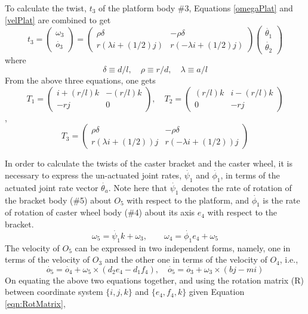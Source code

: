 To calculate the twist, $t_3$ of the platform body \#3, Equations \ref{omegaPlat} and \ref{velPlat} are combined to get
\begin{equation}
\label{twist3}
t_3=\begin{pmatrix}
\omega_3\\\dot{o_3}
\end{pmatrix}=
\begin{pmatrix}
\rho\delta & -\rho\delta\\
r(\lambda i+(1/2)j) & r(-\lambda i+(1/2)j)
\end{pmatrix}
\begin{pmatrix}
\dot{\theta_1}\\\dot{\theta_2}
\end{pmatrix}
\end{equation}
where
\[ \delta\equiv d/l, \quad \rho \equiv r/d, \quad \lambda \equiv a/l \]
From the above three equations, one gets 
\[T_1=\begin{pmatrix}i+(r/l)k & -(r/l)k\\ -rj & 0\end{pmatrix}, \quad  
T_2=\begin{pmatrix}	(r/l)k & i-(r/l)k\\  0 & -rj \end{pmatrix}\],
\[T_3=\begin{pmatrix}
	\rho\delta & -\rho\delta\\
	r(\lambda i+(1/2))j & r(-\lambda i+(1/2))j
	\end{pmatrix}\]


In order to calculate the twists of the caster bracket and the caster wheel, it is necessary to express the  un-actuated joint rates, $\dot{\psi_1}$ and $\dot{\phi_1}$, in terms of the actuated joint rate vector $\dot{\theta_a}$. Note here that $\dot{\psi_1}$ denotes the rate of rotation of the bracket body (\#5) about $O_5$ with respect to the platform, and $\dot{\phi_1}$ is the rate of rotation of caster wheel body (\#4) about its axis $e_4$ with respect to the bracket.
\begin{equation*}
\omega_5=\dot{\psi_1}k+\omega_3, \quad \quad \omega_4=\dot{\phi_1} e_4 +\omega_5
\end{equation*}
 The velocity of $O_5$ can be expressed in two independent forms, namely, one in terms of the velocity of $O_3$ and the other one in terms of the velocity of $O_4$, i.e.,
\begin{equation}
\dot{o_5}=\dot{o_4}+\omega_5\times(d_2e_4-d_1f_4), \quad
\dot{o_5}=\dot{o_3}+\omega_3\times(b j - m i)
\end{equation}
On equating the above two equations together, and using the rotation matrix (R) between coordinate system $\{i,j,k\}$ and $\{e_4,f_4,k\}$ given Equation \ref{eqn:RotMatrix}, 

